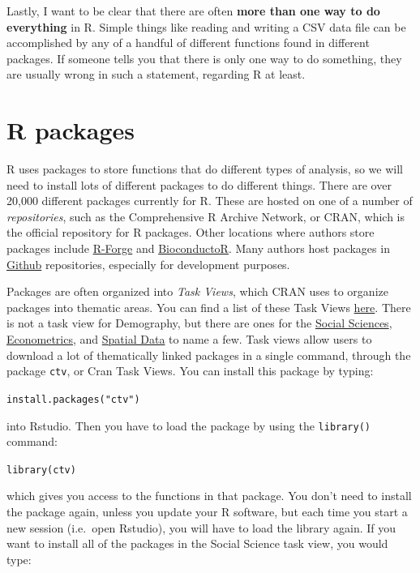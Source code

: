 \documentclass[
  letterpaper,
  DIV=11,
  numbers=noendperiod]{scrreprt}
\begin{document}
Lastly, I want to be clear that there are often \textbf{more than one
way to do everything} in R. Simple things like reading and writing a CSV
data file can be accomplished by any of a handful of different functions
found in different packages. If someone tells you that there is only one
way to do something, they are usually wrong in such a statement,
regarding R at least.

\hypertarget{r-packages}{%
\section{R packages}\label{r-packages}}

R uses packages to store functions that do different types of analysis,
so we will need to install lots of different packages to do different
things. There are over 20,000 different packages currently for R. These
are hosted on one of a number of \emph{repositories}, such as the
Comprehensive R Archive Network, or CRAN, which is the official
repository for R packages. Other locations where authors store packages
include \href{\%22https://r-forge.r-project.org/\%22}{R-Forge} and
\href{\%22https://www.bioconductor.org/\%22}{BioconductoR}. Many authors
host packages in \href{\%22https://github.com\%22}{Github} repositories,
especially for development purposes.

Packages are often organized into \emph{Task Views}, which CRAN uses to
organize packages into thematic areas. You can find a list of these Task
Views \href{\%22https://cran.r-project.org/web/views/\%22}{here}. There
is not a task view for Demography, but there are ones for the
\href{\%22https://cran.r-project.org/web/views/SocialSciences.html\%22}{Social
Sciences},
\href{\%22https://cran.r-project.org/web/views/Econometrics.html\%22}{Econometrics},
and
\href{\%22https://cran.r-project.org/web/views/Spatial.html\%22}{Spatial
Data} to name a few. Task views allow users to download a lot of
thematically linked packages in a single command, through the package
\texttt{ctv}, or Cran Task Views. You can install this package by
typing:

\texttt{install.packages("ctv")}

into Rstudio. Then you have to load the package by using the
\texttt{library()} command:

\texttt{library(ctv)}

which gives you access to the functions in that package. You don't need
to install the package again, unless you update your R software, but
each time you start a new session (i.e.~open Rstudio), you will have to
load the library again. If you want to install all of the packages in
the Social Science task view, you would type:
\end{document}
